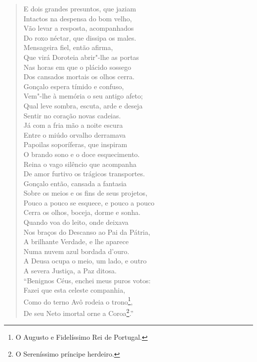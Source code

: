 \begin{verse}
E dois grandes presuntos, que jaziam\\
Intactos na despensa do bom velho,\\
Vão levar a resposta, acompanhados\\
Do roxo néctar, que dissipa os males.\\
Mensageira fiel, então afirma,\\
Que virá Doroteia abrir"-lhe as portas\\
Nas horas em que o plácido sossego\\
Dos cansados mortais os olhos cerra.\\
Gonçalo espera tímido e confuso,\\
Vem"-lhe à memória o seu antigo afeto;\\
Qual leve sombra, escuta, arde e deseja\\
Sentir no coração novas cadeias. \\[10pt]


Já com a fria mão a noite escura\\
Entre o miúdo orvalho derramava\\
Papoilas soporíferas, que inspiram\\
O brando sono e o doce esquecimento.\\
Reina o vago silêncio que acompanha\\
De amor furtivo os trágicos transportes.\\
Gonçalo então, cansada a fantasia\\
Sobre os meios e os fins de seus projetos,\\ %
Pouco a pouco se esquece, e pouco a pouco\\
Cerra os olhos, boceja, dorme e sonha.\\
Quando voa do leito, onde deixava\\
Nos braços do Descanso ao Pai da Pátria,\\ \index{\Paida} %
A brilhante Verdade, e lhe aparece\\		%
Numa nuvem azul bordada d'ouro.\\
A Deusa ocupa o meio, um lado, e outro\\
A severa Justiça, a Paz ditosa. \\[10pt]


``Benignos Céus, enchei meus puros votos:\\
Fazei que esta celeste companhia,\\
Como do terno Avô rodeia o trono\footnote{ O Augusto e Fidelíssimo Rei de Portugal.},\\		\index{\Aug}
De seu Neto imortal orne a Coroa\footnote{ O Sereníssimo príncipe
herdeiro.}.'' \\[10pt] 		\index{\Netoi}



\end{verse}
